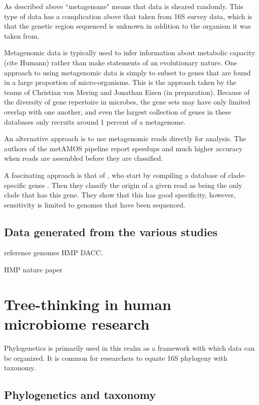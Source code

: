 \documentclass{amsart}
\begin{document}
As described above ``metagenome" means that data is sheared randomly.
This type of data has a complication above that taken from 16S survey data, which is that the genetic region sequenced is unknown in addition to the organism it was taken from.

Metagenomic data is typically used to infer information about metabolic capacity (cite Humann) rather than make statements of an evolutionary nature.
One approach to using metagenomic data is simply to subset to genes that are found in a large proportion of micro-organisms.
This is the approach taken by the teams of Christian von Mering \cite{von2007quantitative,stark2010mltreemap} and Jonathan Eisen \cite{wu2008amphora} (in preparation).
Because of the diversity of gene repertoire in microbes, the gene sets may have only limited overlap with one another, and even the largest collection of genes in these databases only recruits around 1 percent of a metagenome.

An alternative approach is to use metagenomic reads directly for analysis.
The authors of the metAMOS pipeline \cite{treangen2013metamos} report speedups and much higher accuracy when reads are assembled before they are classified.

A fascinating approach is that of \citet{segata2012metagenomic}, who start by compiling a database of clade-specific genes \citep{segata2011metagenomic}.
Then they classify the origin of a given read as being the only clade that has this gene.
They show that this has good specificity, however, sensitivity is limited to genomes that have been sequenced.


\subsection{Data generated from the various studies}
reference genomes
HMP DACC.

HMP nature paper
\cite{methe2012framework}

\section{Tree-thinking in human microbiome research}

Phylogenetics is primarily used in this realm as a framework with which data can be organized.
It is common for researchers to equate 16S phylogeny with taxonomy.

\subsection{Phylogenetics and taxonomy}
\end{document}
